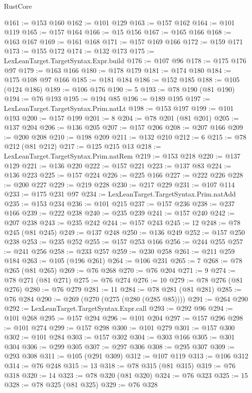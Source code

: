 \begin{lexlean}{RustCore}
\begin{coremodule}
@161 := @153 @160
@162 := @101 @129
@163 := @157 @162
@164 := @101 @119
@165 := @157 @164
@166 := @15 @156
@167 := @165 @166
@168 := @163 @167
@169 := @161 @168
@171 := @157 @169 @166
@172 := @159 @171
@173 := @155 @172
@174 := @132 @173
@175 := LexLeanTarget.TargetSyntax.Expr.build
@176 := @107 @96
@178 := @175 @176 @97
@179 := @163 @166
@180 := @178 @179
@181 := @174 @180
@184 := @175 @108 @97 @166
@185 := @181 @184
@186 := @152 @185
@188 := @105 (@124 @186)
@189 := @106 @176
@190 := 5
@193 := @78 @190 (@81 @190)
@194 := @76 @193
@195 := @194 @85
@196 := @189 @195
@197 := LexLeanTarget.TargetSyntax.Prim.natLt
@198 := @153 @197
@199 := @101 @193
@200 := @157 @199
@201 := 8
@204 := @78 @201 (@81 @201)
@205 := @137 @204
@206 := @136 @205
@207 := @157 @206
@208 := @207 @166
@209 := @200 @208
@210 := @198 @209
@211 := @132 @210
@212 := 6
@215 := @78 @212 (@81 @212)
@217 := @125 @215 @13
@218 := LexLeanTarget.TargetSyntax.Prim.natRem
@219 := @153 @218
@220 := @137 @129
@221 := @136 @220
@222 := @157 @221
@223 := @137 @83
@224 := @136 @223
@225 := @157 @224
@226 := @225 @166
@227 := @222 @226
@228 := @200 @227
@229 := @219 @228
@230 := @217 @229
@231 := @107 @114
@233 := @175 @231 @97
@234 := LexLeanTarget.TargetSyntax.Prim.natAdd
@235 := @153 @234
@236 := @101 @215
@237 := @157 @236
@238 := @237 @166
@239 := @222 @238
@240 := @235 @239
@241 := @157 @240
@242 := @207 @238
@243 := @235 @242
@244 := @157 @243
@245 := 12
@248 := @78 @245 (@81 @245)
@249 := @137 @248
@250 := @136 @249
@252 := @157 @250 @238
@253 := @235 @252
@255 := @157 @253 @166
@256 := @244 @255
@257 := @241 @256
@258 := @233 @257
@259 := @230 @258
@261 := @211 @259 @184
@263 := @105 (@196 @261)
@264 := @106 @231
@265 := 7
@268 := @78 @265 (@81 @265)
@269 := @76 @268
@270 := @76 @204
@271 := 9
@274 := @78 @271 (@81 @271)
@275 := @76 @274
@276 := 10
@279 := @78 @276 (@81 @276)
@280 := @76 @279
@281 := 11
@284 := @78 @281 (@81 @281)
@285 := @76 @284
@290 := @269 (@270 (@275 (@280 (@285 @85))))
@291 := @264 @290
@292 := LexLeanTarget.TargetSyntax.Expr.call
@293 := @292 @96
@294 := @101 @268
@295 := @157 @294
@296 := @101 @204
@297 := @157 @296
@298 := @101 @274
@299 := @157 @298
@300 := @101 @279
@301 := @157 @300
@302 := @101 @284
@303 := @157 @302
@304 := @303 @166
@305 := @301 @304
@306 := @299 @305
@307 := @297 @306
@308 := @295 @307
@309 := @293 @308
@311 := @105 (@291 @309)
@312 := @107 @119
@313 := @106 @312
@314 := @76 @248
@315 := 13
@318 := @78 @315 (@81 @315)
@319 := @76 @318
@320 := 14
@323 := @78 @320 (@81 @320)
@324 := @76 @323
@325 := 15
@328 := @78 @325 (@81 @325)
@329 := @76 @328

\end{coremodule}
\end{lexlean}
